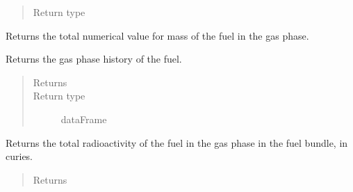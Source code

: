 \documentclass[letterpaper,10pt,openany,oneside,english]{sphinxmanual}
\begin{document}
\begin{fulllineitems}
\begin{fulllineitems}
\begin{quote}
\begin{description}
\item[{Return type}] \leavevmode
{}

\end{description}\end{quote}

\end{fulllineitems}


\begin{fulllineitems}
\label{\detokenize{support_rst/fuel_bundle:fuel_bundle.FuelBundle.gas_mass}}
Returns the total numerical value for mass of the fuel in the gas
phase.

\end{fulllineitems}


\begin{fulllineitems}
\label{\detokenize{support_rst/fuel_bundle:fuel_bundle.FuelBundle.gas_phase}}
Returns the gas phase history of the fuel.
\begin{quote}\begin{description}
\item[{Returns}] \leavevmode
{}

\item[{Return type}] \leavevmode
dataFrame

\end{description}\end{quote}

\end{fulllineitems}


\begin{fulllineitems}
\label{\detokenize{support_rst/fuel_bundle:fuel_bundle.FuelBundle.gas_radioactivity}}
Returns the total radioactivity of the fuel in the gas phase in the
fuel bundle, in curies.
\begin{quote}\begin{description}
\item[{Returns}] \leavevmode
{}


\end{description}
\end{quote}
\end{fulllineitems}
\end{fulllineitems}
\end{document}
